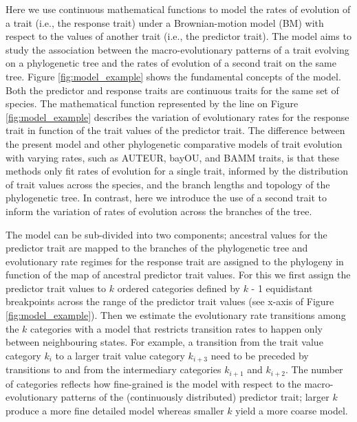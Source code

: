 Here we use continuous mathematical functions to model the rates of evolution of a trait (i.e., the response trait) under a Brownian-motion model (BM) with respect to the values of another trait (i.e., the predictor trait). The model aims to study the association between the macro-evolutionary patterns of a trait evolving on a phylogenetic tree and the rates of evolution of a second trait on the same tree. Figure \ref{fig:model_example} shows the fundamental concepts of the model. %
Both the predictor and response traits are continuous traits for the same set of species. The mathematical function represented by the line on Figure \ref{fig:model_example} describes the variation of evolutionary rates for the response trait in function of the trait values of the predictor trait. The difference between the present model and other phylogenetic comparative models of trait evolution with varying rates, such as AUTEUR, bayOU, and BAMM traits, is that these methods only fit rates of evolution for a single trait, informed by the distribution of trait values across the species, and the branch lengths and topology of the phylogenetic tree. In contrast, here we introduce the use of a second trait to inform the variation of rates of evolution across the branches of the tree.

The model can be sub-divided into two components; ancestral values for the predictor trait are mapped to the branches of the phylogenetic tree and evolutionary rate regimes for the response trait are assigned to the phylogeny in function of the map of ancestral predictor trait values. For this we first assign the predictor trait values to $\mathit{k}$ ordered categories defined by $\mathit{k}$ - 1 equidistant breakpoints across the range of the predictor trait values (see x-axis of Figure \ref{fig:model_example}). Then we estimate the evolutionary rate transitions among the $\mathit{k}$ categories with a model that restricts transition rates to happen only between neighbouring states. For example, a transition from the trait value category $\mathit{k_{i}}$ to a larger trait value category $\mathit{k_{i+3}}$ need to be preceded by transitions to and from the intermediary categories $\mathit{k_{i+1}}$ and $\mathit{k_{i+2}}$. The number of categories reflects how fine-grained is the model with respect to the macro-evolutionary patterns of the (continuously distributed) predictor trait; larger $\mathit{k}$ produce a more fine detailed model whereas smaller $\mathit{k}$ yield a more coarse model.

